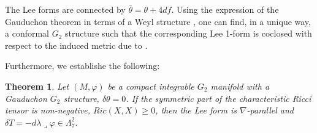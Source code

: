 \documentclass[10pt,british]{article}
\newtheorem{thrm}{Theorem}[section]
\def\sb {{\nabla}}
\def\p{{\varphi}}
\begin{document}
The Lee forms are connected by $\bar\theta=\theta+4df$. Using the expression of the Gauduchon theorem 
 in terms of a Weyl structure \cite [Appendix 1]{tod},
one can find, in a unique way, a conformal $G_2$ structure such that the corresponding Lee 
1-form is coclosed with respect to the induced metric due to \cite[Theorem~3.1]{FI1}.

Furthermore, we establishe the following:
\begin{thrm}\label{RG}
Let $(M,\p)$ be a compact integrable $G_2$ manifold with a Gauduchon $G_2$ structure, $\delta\theta=0$.  
 If  the symmetric part of the characteristic Ricci tensor  is non-negative, $Ric(X,X)\ge 0$, then the Lee form is $\sb$-parallel and $\delta T=-d\lambda\lrcorner\p\in\Lambda^2_7$.
\end{thrm}
\end{document}
